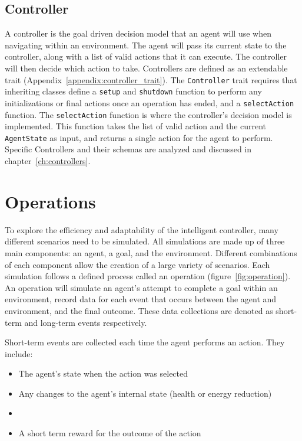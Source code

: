\subsection{Controller} \label{subsec:controller}
A controller is the goal driven decision model that an agent will use when navigating within an environment.
The agent will pass its current state to the controller, along with a list of valid actions that it can execute.
The controller will then decide which action to take.
Controllers are defined as an extendable trait (Appendix~\ref{appendix:controller_trait}).
The \texttt{Controller} trait requires that inheriting classes define a \texttt{setup} and \texttt{shutdown} function to perform any initializations or final actions once an operation has ended, and a \texttt{selectAction} function.
The \texttt{selectAction} function is where the controller's decision model is implemented.
This function takes the list of valid action and the current \texttt{AgentState} as input, and returns a single action for the agent to perform.
Specific Controllers and their schemas are analyzed and discussed in chapter~\ref{ch:controllers}.




\section{Operations} \label{sec:operations}
To explore the efficiency and adaptability of the intelligent controller, many different scenarios need to be simulated.
All simulations are made up of three main components: an agent, a goal, and the environment.
Different combinations of each component allow the creation of a large variety of scenarios.
Each simulation follows a defined process called an operation (figure~\ref{fig:operation}).
An operation will simulate an agent's attempt to complete a goal within an environment, record data for each event that occurs between the agent and environment, and the final outcome.
These data collections are denoted as short-term and long-term events respectively.

\noindent
Short-term events are collected each time the agent performs an action.
They include:

\begin{itemize}
  \setlength\itemsep{-12pt}
  \item The agent's state when the action was selected
  \item Any changes to the agent's internal state (health or energy reduction)
  \item {}
  \setlength\itemsep{0pt}
  \item A short term reward for the outcome of the action
\end{itemize}

